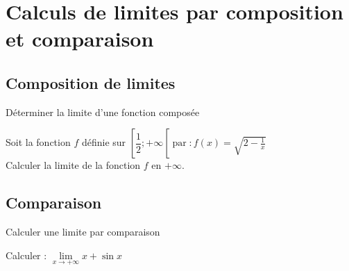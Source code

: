 \section{Calculs de limites par composition et comparaison}
\subsection{Composition de limites}

\begin{bmethodet}{Déterminer la limite d'une fonction composée}
	
	Soit la fonction $f$ définie sur $\left[\dfrac{1}{2} ;+\infty\left[\operatorname{par}: f(x)=\sqrt{2-\frac{1}{x}}\right.\right.$\\
	Calculer la limite de la fonction $f$ en $+\infty$.
	

\end{bmethodet}

\subsection{Comparaison}

\begin{bmethodet}{Calculer une limite par comparaison}
	
	Calculer : $\lim \limits_{x \rightarrow+\infty} x+\sin x$
\end{bmethodet}